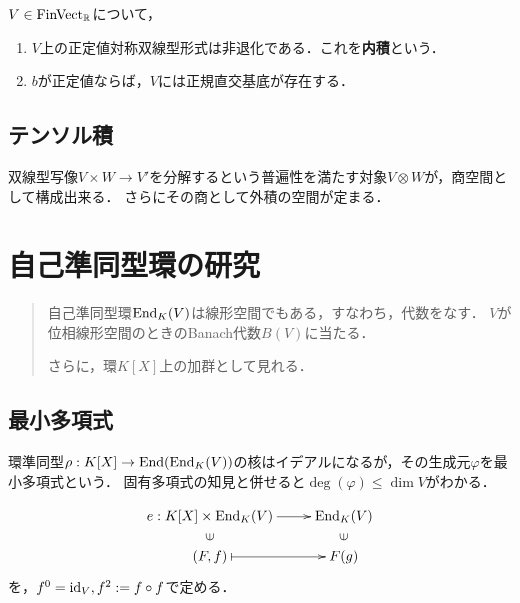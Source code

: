 \documentclass[uplatex,dvipdfmx]{jsreport}
\begin{document}
\begin{lemma}
    $V\in\mathrm{FinVect}_{\mathbb{R}}$について，
    \begin{enumerate}
        \item $V$上の正定値対称双線型形式は非退化である．これを\textbf{内積}という．
        \item $b$が正定値ならば，$V$には正規直交基底が存在する．
    \end{enumerate}
\end{lemma}

\section{テンソル積}

\begin{tcolorbox}[colframe=ForestGreen, colback=ForestGreen!10!white,breakable,colbacktitle=ForestGreen!40!white,coltitle=black,fonttitle=\bfseries\sffamily,
title=]
    双線型写像$V\times W\to V'$を分解するという普遍性を満たす対象$V\otimes W$が，商空間として構成出来る．
    さらにその商として外積の空間が定まる．
\end{tcolorbox}

\chapter{自己準同型環の研究}

\begin{quotation}
    自己準同型環$\mathrm{End}_K(V)$は線形空間でもある，すなわち，代数をなす．
    $V$が位相線形空間のときのBanach代数$B(V)$に当たる．

    さらに，環$K[X]$上の加群として見れる．
\end{quotation}

\section{最小多項式}

\begin{tcolorbox}[colframe=ForestGreen, colback=ForestGreen!10!white,breakable,colbacktitle=ForestGreen!40!white,coltitle=black,fonttitle=\bfseries\sffamily,
title=]
    環準同型$\rho:K[X]\to\mathrm{End}(\mathrm{End}_K(V))$の核はイデアルになるが，その生成元$\varphi$を最小多項式という．
    固有多項式の知見と併せると$\deg(\varphi)\le\dim V$がわかる．
\end{tcolorbox}

\begin{notation}
    \[\xymatrix@R-2pc{
        e:K[X]\times\End_K(V)\ar[r]&\End_K(V)\\
        \rotatebox[origin=c]{90}{$\in$}&\rotatebox[origin=c]{90}{$\in$}\\
        (F,f)\ar@{|->}[r]&F(g)
    }\]
    を，$f^0=\mathrm{id}_V,f^2:=f\circ f$で定める．
\end{notation}
\end{document}
